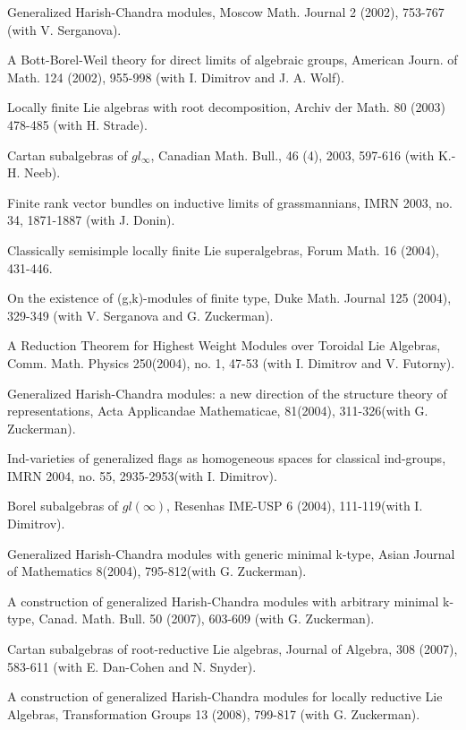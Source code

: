 \myss \label{30.} Generalized Harish-Chandra modules, Moscow Math.
Journal 2 (2002), 753-767 (with V. Serganova).

\myss \label{31.} A Bott-Borel-Weil theory for direct limits of
algebraic groups, American Journ. of Math.  124 (2002), 955-998
(with I. Dimitrov and J. A. Wolf).

\myss \label{32.} Locally finite Lie algebras with root
decomposition, Archiv der Math. 80 (2003) 478-485 (with H.
Strade).

\myss \label{33.} Cartan subalgebras of $gl_{\infty}$, Canadian Math.
Bull., 46 (4), 2003, 597-616 (with K.-H. Neeb).

\myss \label{34.} Finite rank vector bundles on inductive limits of
grassmannians, IMRN 2003, no. 34, 1871-1887  (with J. Donin).

\myss \label{35.} Classically semisimple locally finite Lie
superalgebras, Forum Math. 16 (2004), 431-446.

\myss \label{36.} On the existence of (g,k)-modules of finite
type, Duke Math. Journal 125 (2004), 329-349
(with V. Serganova and G. Zuckerman).

\myss \label{37.} A Reduction Theorem for Highest Weight Modules
over Toroidal Lie Algebras, Comm. Math. Physics 250(2004), no. 1, 47-53 (with I. Dimitrov and V. Futorny).

\myss \label{38.} Generalized Harish-Chandra modules: a new direction of
the structure theory of representations, Acta Applicandae Mathematicae,
81(2004), 311-326(with G. Zuckerman).

\myss \label{39.} Ind-varieties of generalized flags as homogeneous
spaces for classical ind-groups, IMRN 2004, no. 55, 2935-2953(with I. Dimitrov).

\myss \label{40.} Borel subalgebras of $gl(\infty)$, Resenhas IME-USP 6 (2004), 111-119(with I. Dimitrov).

\myss \label{41.} Generalized Harish-Chandra modules with generic minimal k-type,
Asian Journal of Mathematics 8(2004), 795-812(with G. Zuckerman).

\myss \label{42.} A construction of generalized Harish-Chandra modules with arbitrary minimal k-type, Canad. Math. Bull. 50 (2007), 603-609 (with G. Zuckerman). 

\myss \label{43.} Cartan subalgebras of root-reductive Lie algebras, Journal of Algebra, 308 (2007), 583-611 (with E. Dan-Cohen and N. Snyder).

\myss \label{44.} A construction of generalized Harish-Chandra modules for locally reductive Lie Algebras, Transformation Groups 13 (2008), 799-817 (with G. Zuckerman).

